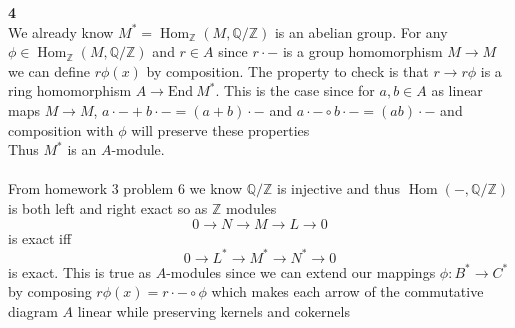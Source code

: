 \documentclass[12pt]{article}
\newenvironment{ques}[1]{\textbf{#1}\vspace{1 mm}\\ }{\bigskip}
\theoremstyle{definition}
\DeclareMathOperator\Hom{Hom}
\newcommand{\Q}{\mathbb Q}
\newcommand{\Z}{\mathbb Z}
\newcommand{\End}{\text{End}}
\begin{document}
\begin{ques}{4}
	We already know $M^* = \Hom_\Z(M, \Q/\Z)$ is an abelian group. For any $\phi \in
	\Hom_\Z(M, \Q/\Z)$ and $r \in A$ since $r \cdot -$ is a group homomorphism
	$M \to M$ we can define $r \phi(x)$ by composition. The property to check
	is that $r \to r \phi$ is a ring homomorphism $A \to \End\ M^*$. This is
	the case since for $a,b \in A$ as linear maps $M \to M$, $a\cdot - + b
	\cdot - = (a + b) \cdot -$ and $a\cdot - \circ b \cdot - = (ab) \cdot -$
	and composition with $\phi$ will preserve these properties
	\\
	Thus $M^*$ is an $A$-module. \\
	\\
	From homework 3 problem $6$ we know $\Q/\Z$ is injective and thus $\Hom(-,
	\Q/\Z)$ is both left and right exact so as $\Z$ modules 
	$$0 \to N \to M \to L \to 0$$
	is exact iff 
	$$0 \to L^* \to M^* \to N^* \to 0$$
	is exact. This is true as $A$-modules since we can extend our mappings
	$\phi:B^* \to C^*$ by composing $r \phi(x) = r \cdot - \circ \phi$ which
	makes each arrow of the commutative diagram $A$ linear while preserving
	kernels and cokernels
\end{ques}
\end{document}
